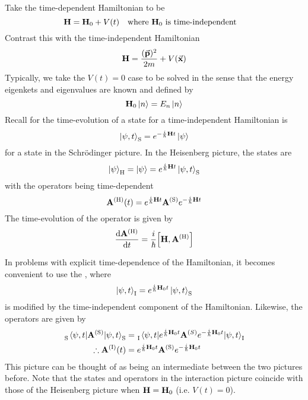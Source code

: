 \documentclass[12pt,a4paper,titlepage]{article}
\newcommand{\trm}[1]{\textrm{#1}} %
\newcommand{\ul}[1]{\underline{\smash{#1}}} %
\begin{document}
Take the time-dependent Hamiltonian to be
\begin{equation}
\vb{H}=\vb{H}_{0}+V(t)\qq{where $\vb{H}_{0}$ is time-independent}
\end{equation}
Contrast this with the time-independent Hamiltonian
\begin{equation}
\vb{H}=\frac{(\vec{\vb{p}})^{2}}{2m}+V(\vec{\vb{x}})
\end{equation}
Typically, we take the $V(t)=0$ case to be solved in the sense that the energy eigenkets and eigenvalues are known and defined by
\begin{equation}
\vb{H}_{0}\ket{n}=E_{n}\ket{n}
\end{equation}
Recall for the time-evolution of a state for a time-independent Hamiltonian is
\begin{equation}
\ket{\psi,t}_{\trm{S}}=e^{-\frac{i}{\hbar}\vb{H}t}\ket{\psi}
\end{equation}
for a state in the Schr\"{o}dinger picture. In the Heisenberg picture, the states are
\begin{equation}
\ket{\psi}_{\trm{H}}=\ket{\psi}=e^{\frac{i}{\hbar}\vb{H}t}\ket{\psi,t}_{\trm{S}}
\end{equation}
with the operators being time-dependent
\begin{equation}
\vb{A}^{(\trm{H})}(t)=e^{\frac{i}{\hbar}\vb{H}t}\vb{A}^{(\trm{S})}e^{-\frac{i}{\hbar}\vb{H}t}
\end{equation}
The time-evolution of the operator is given by
\begin{equation}
\dv{\vb{A}^{(\trm{H})}}{t}=\frac{i}{\hbar}\comm{\vb{H}}{\vb{A}^{(\trm{H})}}
\end{equation}

In problems with explicit time-dependence of the Hamiltonian, it becomes convenient to use the \ul{interaction picture}, where
\begin{equation}
\ket{\psi,t}_{\trm{I}}=e^{\frac{i}{\hbar}\vb{H}_{0}t}\ket{\psi,t}_{\trm{S}}
\end{equation}
is modified by the time-independent component of the Hamiltonian. Likewise, the operators are given by
\begin{equation}
\begin{aligned}
\tensor[_{\trm{S}}]{\mel{\psi,t}{\vb{A}^{(\trm{S})}}{\psi,t}}{_{\trm{S}}}&=\tensor[_{\trm{I}}]{\mel{\psi,t}{e^{\frac{i}{\hbar}\vb{H}_{0}t}\vb{A}^{(S)}e^{-\frac{i}{\hbar}\vb{H}_{0}t}}{\psi,t}}{_{\trm{I}}}\\
\therefore\vb{A}^{(\trm{I})}(t)&=e^{\frac{i}{\hbar}\vb{H}_{0}t}\vb{A}^{(\trm{S})}e^{-\frac{i}{\hbar}\vb{H}_{0}t}
\end{aligned}
\end{equation}
This picture can be thought of as being an intermediate between the two pictures before. Note that the states and operators in the interaction picture coincide with those of the Heisenberg picture when $\vb{H}=\vb{H}_{0}$ (i.e. $V(t)=0$).\\
\end{document}
